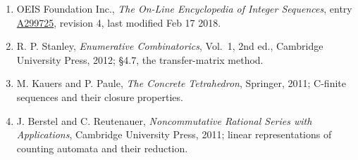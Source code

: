 \documentclass[11pt]{article}
\theoremstyle{definition}
\begin{document}
\begin{enumerate}

\item OEIS Foundation Inc., \emph{The On-Line Encyclopedia of Integer Sequences}, entry \href{https://oeis.org/A299725}{A299725}, revision 4, last modified Feb 17 2018.

\item R. P. Stanley, \emph{Enumerative Combinatorics}, Vol.~1, 2nd ed., Cambridge University Press, 2012; \S4.7, the transfer-matrix method.

\item M. Kauers and P. Paule, \emph{The Concrete Tetrahedron}, Springer, 2011; C-finite sequences and their closure properties.

\item J. Berstel and C. Reutenauer, \emph{Noncommutative Rational Series with Applications}, Cambridge University Press, 2011; linear representations of counting automata and their reduction.

\end{enumerate}
\end{document}
